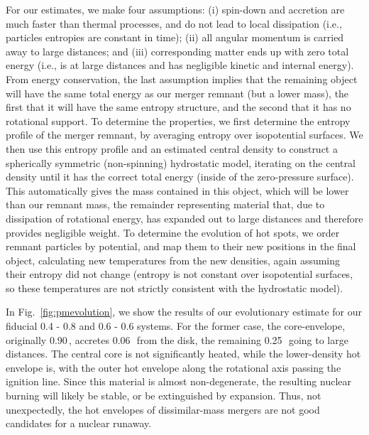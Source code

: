 For our estimates, we make four assumptions: (i) spin-down and accretion are much faster than thermal processes, and do not lead to local dissipation (i.e., particles entropies are constant in time); (ii) all angular momentum is carried away to large distances; and (iii) corresponding matter ends up with zero total energy (i.e., is at large distances and has negligible kinetic and internal energy).  From energy conservation, the last assumption implies that the remaining object will have the same total energy as our merger remnant (but a lower mass), the first that it will have the same entropy structure, and the second that it has no rotational support.  To determine the properties, we first determine the entropy profile of the merger remnant, by averaging entropy over isopotential surfaces.  We then use this entropy profile and an estimated central density to construct a spherically symmetric (non-spinning) hydrostatic model, iterating on the central density until it has the correct total energy (inside of the zero-pressure surface).  This automatically gives the mass contained in this object, which will be lower than our remnant mass, the remainder representing material that, due to dissipation of rotational energy, has expanded out to large distances and therefore provides negligible weight.  To determine the evolution of hot spots, we order remnant particles by potential, and map them to their new positions in the final object, calculating new temperatures from the new densities, again assuming their entropy did not change (entropy is not constant over isopotential surfaces, so these temperatures are not strictly consistent with the hydrostatic model).

In Fig.~\ref{fig:pmevolution}, we show the results of our evolutionary estimate for our fiducial 0.4 - 0.8 and 0.6 - 0.6 {\Msun} systems.  For the former case, the core-envelope, originally 0.90\,\Msun, accretes 0.06\,\Msun\ from the disk, the remaining 0.25\,\Msun\ going to large distances.  The central core is not significantly heated, while the lower-density hot envelope is, with the outer hot envelope along the rotational axis passing the ignition line.  Since this material is almost non-degenerate, the resulting nuclear burning will likely be stable, or be extinguished by expansion.  Thus, not unexpectedly, the hot envelopes of dissimilar-mass mergers are not good candidates for a nuclear runaway.  


